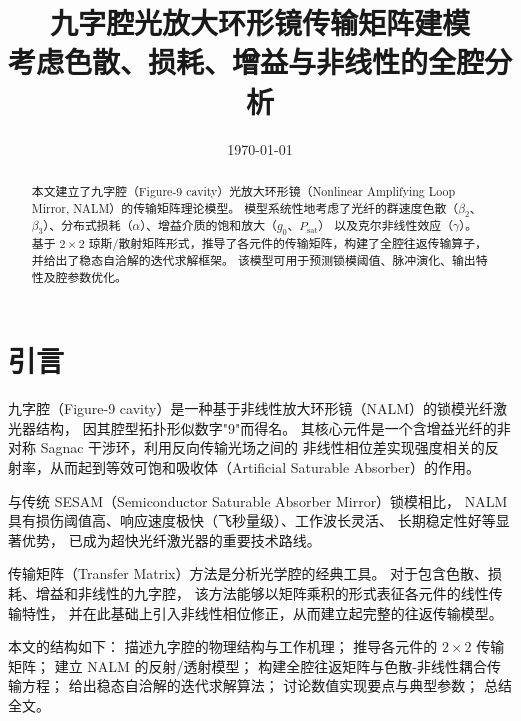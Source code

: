\documentclass[11pt,a4paper]{ctexart}
\title{\textbf{九字腔光放大环形镜传输矩阵建模}\\[0.5em]
       \large 考虑色散、损耗、增益与非线性的全腔分析}
\author{}
\date{\today}
\begin{document}
\maketitle

\begin{abstract}
\noindent 本文建立了九字腔（Figure-9 cavity）光放大环形镜（Nonlinear Amplifying Loop Mirror, NALM）的传输矩阵理论模型。
模型系统性地考虑了光纤的群速度色散（$\beta_2$、$\beta_3$）、分布式损耗（$\alpha$）、增益介质的饱和放大（$g_0$、$P_{\text{sat}}$）
以及克尔非线性效应（$\gamma$）。
基于 $2\times2$ 琼斯/散射矩阵形式，推导了各元件的传输矩阵，构建了全腔往返传输算子，并给出了稳态自洽解的迭代求解框架。
该模型可用于预测锁模阈值、脉冲演化、输出特性及腔参数优化。
\end{abstract}

\tableofcontents
\newpage

\section{引言}

九字腔（Figure-9 cavity）是一种基于非线性放大环形镜（NALM）的锁模光纤激光器结构，
因其腔型拓扑形似数字"9"而得名\cite{duling1991all}。
其核心元件是一个含增益光纤的非对称 Sagnac 干涉环，利用反向传输光场之间的
非线性相位差实现强度相关的反射率，从而起到等效可饱和吸收体（Artificial Saturable Absorber）的作用。

与传统 SESAM（Semiconductor Saturable Absorber Mirror）锁模相比，
NALM 具有损伤阈值高、响应速度极快（飞秒量级）、工作波长灵活、
长期稳定性好等显著优势\cite{haus1991coupled,fermann2013ultrafast}，
已成为超快光纤激光器的重要技术路线。

传输矩阵（Transfer Matrix）方法是分析光学腔的经典工具\cite{jones1941new}。
对于包含色散、损耗、增益和非线性的九字腔，
该方法能够以矩阵乘积的形式表征各元件的线性传输特性，
并在此基础上引入非线性相位修正，从而建立起完整的往返传输模型。

本文的结构如下：
 描述九字腔的物理结构与工作机理；
 推导各元件的 $2\times2$ 传输矩阵；
 建立 NALM 的反射/透射模型；
 构建全腔往返矩阵与色散-非线性耦合传输方程；
 给出稳态自洽解的迭代求解算法；
 讨论数值实现要点与典型参数；
 总结全文。

\end{document}
